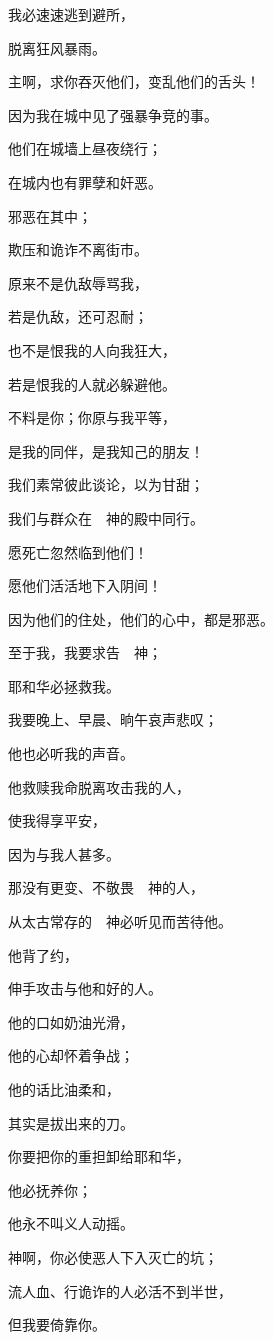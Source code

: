 {\Q {}我必速速逃到避所，
\par }{\Q 脱离狂风暴雨。
\par }{\BB \par }{\Q {}主啊，求你吞灭他们，变乱他们的舌头！
\par }{\Q 因为我在城中见了强暴争竞的事。
\par }{\Q {}他们在城墙上昼夜绕行；
\par }{\Q 在城内也有罪孽和奸恶。
\par }{\Q {}邪恶在其中；
\par }{\Q 欺压和诡诈不离街市。
\par }{\BB \par }{\Q {}原来不是仇敌辱骂我，
\par }{\Q 若是仇敌，还可忍耐；
\par }{\Q 也不是恨我的人向我狂大，
\par }{\Q 若是恨我的人就必躲避他。
\par }{\Q {}不料是你；你原与我平等，
\par }{\Q 是我的同伴，是我知己的朋友！
\par }{\Q {}我们素常彼此谈论，以为甘甜；
\par }{\Q 我们与群众在　神的殿中同行。
\par }{\Q {}愿死亡忽然临到他们！
\par }{\Q 愿他们活活地下入阴间！
\par }{\Q 因为他们的住处，他们的心中，都是邪恶。
\par }{\BB \par }{\Q {}至于我，我要求告　神；
\par }{\Q 耶和华必拯救我。
\par }{\Q {}我要晚上、早晨、晌午哀声悲叹；
\par }{\Q 他也必听我的声音。
\par }{\Q {}他救赎我命脱离攻击我的人，
\par }{\Q 使我得享平安，
\par }{\Q 因为与我{}人甚多。
\par }{\Q {}那没有更变、不敬畏　神的人，
\par }{\Q 从太古常存的　神必听见而苦待他。
\par }{\BB \par }{\Q {}他背了约，
\par }{\Q 伸手攻击与他和好的人。
\par }{\Q {}他的口如奶油光滑，
\par }{\Q 他的心却怀着争战；
\par }{\Q 他的话比油柔和，
\par }{\Q 其实是拔出来的刀。
\par }{\BB \par }{\Q {}你要把你的重担卸给耶和华，
\par }{\Q 他必抚养你；
\par }{\Q 他永不叫义人动摇。
\par }{\BB \par }{\Q {}神啊，你必使恶人下入灭亡的坑；
\par }{\Q 流人血、行诡诈的人必活不到半世，
\par }{\Q 但我要倚靠你。

}
